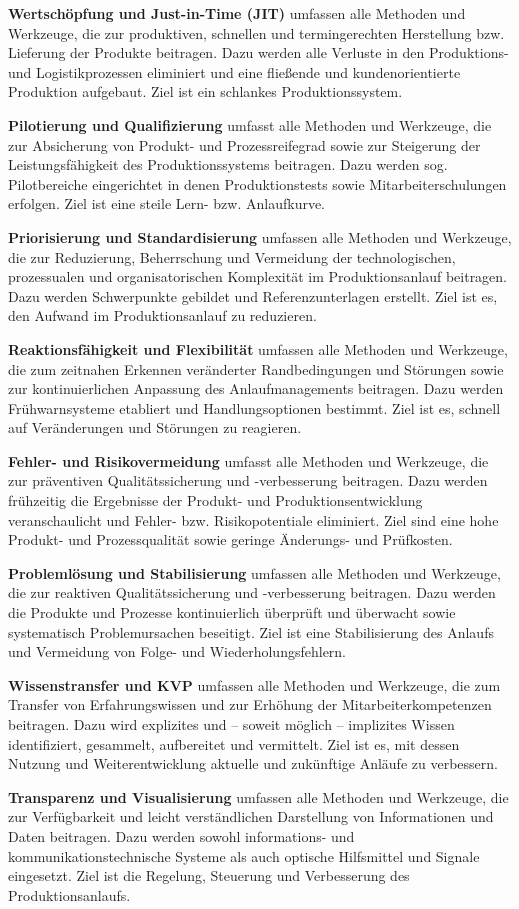  \textbf{Wertschöpfung und Just-in-Time (JIT)}
umfassen alle Methoden und Werkzeuge, die zur produktiven, schnellen
und termingerechten Herstellung
bzw. Lieferung der Produkte beitragen. Dazu werden alle Verluste in den
Produktions- und Logistikprozessen
eliminiert und eine fließende und
kundenorientierte Produktion aufgebaut. Ziel ist ein schlankes Produktionssystem.

 \textbf{Pilotierung und Qualifizierung} umfasst
alle Methoden und Werkzeuge, die
zur Absicherung von Produkt- und
Prozessreifegrad sowie zur Steigerung der Leistungsfähigkeit des Produktionssystems beitragen. Dazu
werden sog. Pilotbereiche eingerichtet in denen Produktionstests sowie
Mitarbeiterschulungen erfolgen. Ziel
ist eine steile Lern- bzw. Anlaufkurve.

 \textbf{Priorisierung und Standardisierung}
umfassen alle Methoden und Werkzeuge, die zur Reduzierung, Beherrschung und Vermeidung der technologischen, prozessualen und organisatorischen Komplexität im Produktionsanlauf beitragen. Dazu werden
Schwerpunkte gebildet und Referenzunterlagen erstellt. Ziel ist es, den
Aufwand im Produktionsanlauf zu reduzieren.

 \textbf{Reaktionsfähigkeit und Flexibilität} umfassen alle Methoden und Werkzeuge,
die zum zeitnahen Erkennen veränderter Randbedingungen und Störungen sowie zur kontinuierlichen Anpassung des Anlaufmanagements beitragen. Dazu werden Frühwarnsysteme etabliert und Handlungsoptionen
bestimmt. Ziel ist es, schnell auf Veränderungen und Störungen zu reagieren.

 \textbf{Fehler- und Risikovermeidung} umfasst
alle Methoden und Werkzeuge, die
zur präventiven Qualitätssicherung
und -verbesserung beitragen. Dazu
werden frühzeitig die Ergebnisse der
Produkt- und Produktionsentwicklung veranschaulicht und Fehler- bzw.
Risikopotentiale eliminiert. Ziel sind
eine hohe Produkt- und Prozessqualität sowie geringe Änderungs- und
Prüfkosten.

 \textbf{Problemlösung und Stabilisierung} umfassen alle Methoden und Werkzeuge,
die zur reaktiven Qualitätssicherung
und -verbesserung beitragen. Dazu
werden die Produkte und Prozesse
kontinuierlich überprüft und überwacht sowie systematisch Problemursachen beseitigt. Ziel ist eine Stabilisierung des Anlaufs und Vermeidung
von Folge- und Wiederholungsfehlern.

 \textbf{Wissenstransfer und KVP} umfassen
alle Methoden und Werkzeuge, die
zum Transfer von Erfahrungswissen
und zur Erhöhung der Mitarbeiterkompetenzen beitragen. Dazu wird
explizites und – soweit möglich – implizites Wissen identifiziert, gesammelt, aufbereitet und vermittelt. Ziel
ist es, mit dessen Nutzung und
Weiterentwicklung aktuelle und zukünftige Anläufe zu verbessern.

 \textbf{Transparenz und Visualisierung} umfassen alle Methoden und Werkzeuge,
die zur Verfügbarkeit und leicht verständlichen Darstellung von Informationen und Daten beitragen. Dazu
werden sowohl informations- und
kommunikationstechnische Systeme
als auch optische Hilfsmittel und Signale eingesetzt. Ziel ist die Regelung,
Steuerung und Verbesserung des Produktionsanlaufs.
